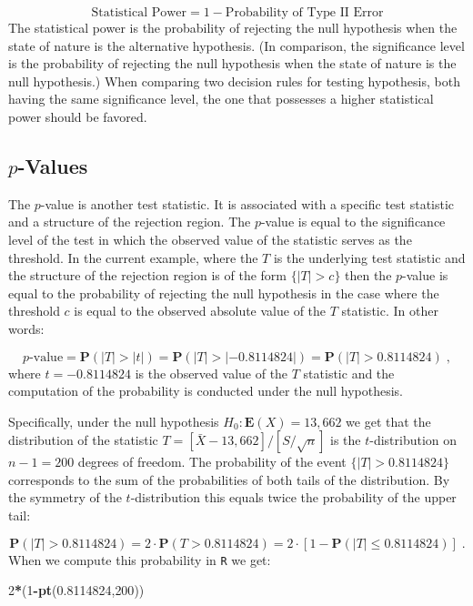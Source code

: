 \documentclass[]{krantz}
\makeatletter
\newenvironment{Shaded}{\begin{snugshade}}{\end{snugshade}}
\newcommand{\DecValTok}[1]{\textcolor[rgb]{0.00,0.00,0.81}{#1}}
\newcommand{\FloatTok}[1]{\textcolor[rgb]{0.00,0.00,0.81}{#1}}
\newcommand{\KeywordTok}[1]{\textcolor[rgb]{0.13,0.29,0.53}{\textbf{#1}}}
\newcommand{\NormalTok}[1]{#1}
\newcommand{\OperatorTok}[1]{\textcolor[rgb]{0.81,0.36,0.00}{\textbf{#1}}}
\newcommand{\Expec}{\mathbf{E}}
\newcommand{\Prob}{\mathbf{P}}
\newenvironment{kframe}{%
\medskip{}
\setlength{\fboxsep}{.8em}
 \def\at@end@of@kframe{}%
 \ifinner\ifhmode%
  \def\at@end@of@kframe{\end{minipage}}%
  \begin{minipage}{\columnwidth}%
 \fi\fi%
 \def\FrameCommand##1{\hskip\@totalleftmargin \hskip-\fboxsep
 \colorbox{shadecolor}{##1}\hskip-\fboxsep
     \hskip-\linewidth \hskip-\@totalleftmargin \hskip\columnwidth}%
 \MakeFramed {\advance\hsize-\width
   \@totalleftmargin\z@ \linewidth\hsize
   \@setminipage}}%
 {\par\unskip\endMakeFramed%
 \at@end@of@kframe}
\renewenvironment{Shaded}{\begin{kframe}}{\end{kframe}}
\theoremstyle{definition}
\theoremstyle{definition}
\theoremstyle{definition}
\theoremstyle{remark}
\makeatother
\begin{document}
\[\mbox{Statistical Power} = 1 - \mbox{Probability of Type II Error}\]
The statistical power is the probability of rejecting the null
hypothesis when the state of nature is the alternative hypothesis. (In
comparison, the significance level is the probability of rejecting the
null hypothesis when the state of nature is the null hypothesis.) When
comparing two decision rules for testing hypothesis, both having the
same significance level, the one that possesses a higher statistical
power should be favored.

\hypertarget{p-values}{%
\subsection{\texorpdfstring{\(p\)-Values}{p-Values}}\label{p-values}}

The \(p\)-value is another test statistic. It is associated with a
specific test statistic and a structure of the rejection region. The
\(p\)-value is equal to the significance level of the test in which the
observed value of the statistic serves as the threshold. In the current
example, where the \(T\) is the underlying test statistic and the
structure of the rejection region is of the form \(\{|T| > c\}\) then the
\(p\)-value is equal to the probability of rejecting the null hypothesis
in the case where the threshold \(c\) is equal to the observed absolute
value of the \(T\) statistic. In other words:

\[\mbox{$p$-value} = \Prob(|T| > |t|) = \Prob(|T| > |-0.8114824|)= \Prob(|T| > 0.8114824)\;,\]
where \(t=-0.8114824\) is the observed value of the \(T\) statistic and the
computation of the probability is conducted under the null hypothesis.

Specifically, under the null hypothesis \(H_0: \Expec(X) = 13,662\) we get
that the distribution of the statistic
\(T = [\bar X - 13,662]/[S/\sqrt{n}]\) is the \(t\)-distribution on
\(n-1 = 200\) degrees of freedom. The probability of the event
\(\{|T| > 0.8114824\}\) corresponds to the sum of the probabilities of
both tails of the distribution. By the symmetry of the \(t\)-distribution
this equals twice the probability of the upper tail:

\[\Prob(|T| > 0.8114824) = 2\cdot \Prob(T> 0.8114824) = 2\cdot [1-\Prob(|T| \leq 0.8114824)]\;.\]
When we compute this probability in \texttt{R} we get:

\begin{Shaded}
\begin{Highlighting}[]
\DecValTok{2}\OperatorTok{*}\NormalTok{(}\DecValTok{1}\OperatorTok{-}\KeywordTok{pt}\NormalTok{(}\FloatTok{0.8114824}\NormalTok{,}\DecValTok{200}\NormalTok{))}
\end{Highlighting}
\end{Shaded}
\end{document}
